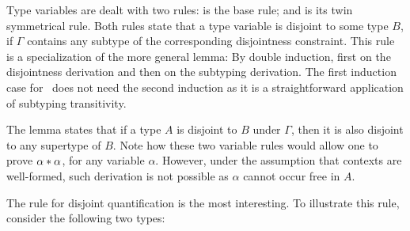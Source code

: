 Type variables are dealt with two rules:
 is the base rule; and 
is its twin symmetrical rule. 
Both rules state that a type variable is disjoint to some type $B$, if $\Gamma$ contains any
subtype of the corresponding disjointness constraint. 
This rule is a specialization of the more general lemma:
{By double induction, first on the disjointness derivation and then on the subtyping derivation.
The first induction case for~ does not need the second induction as it is 
a straightforward application of subtyping transitivity.}
%

The lemma states that if a type $A$ is disjoint to $B$ under $\Gamma$, then it is also disjoint
to any supertype of $B$. 
Note how these two variable rules would allow one to prove $\alpha * \alpha$, for any 
variable $\alpha$.
However, under the assumption that contexts are well-formed, such derivation is not possible 
as $\alpha$ cannot occur free in $A$. 

The rule for disjoint quantification  is the most interesting. 
To illustrate this rule, consider the following two types:

